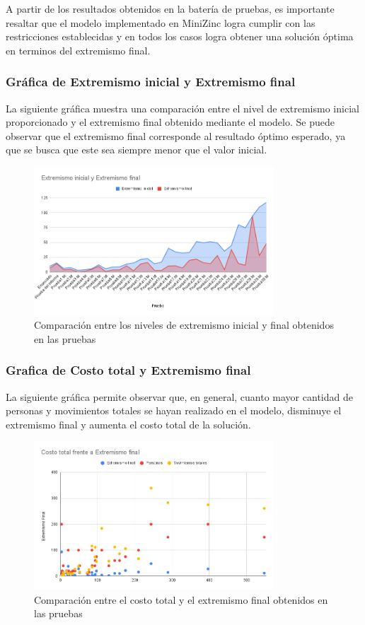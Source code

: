 \documentclass[11pt,letter]{article}
\begin{document}
A partir de los resultados obtenidos en la batería de pruebas, es importante resaltar que el modelo implementado en MiniZinc logra cumplir con las restricciones establecidas y en todos los casos logra obtener una solución óptima en terminos del extremismo final.

\subsubsection*{Gráfica de Extremismo inicial y Extremismo final}
La siguiente gráfica muestra una comparación entre el nivel de extremismo inicial proporcionado y el extremismo final obtenido mediante el modelo. Se puede observar que el extremismo final corresponde al resultado óptimo esperado, ya que se busca que este sea siempre menor que el valor inicial.
\begin{figure}[H]
    \centering
    \includegraphics[width=0.8\textwidth]{resources/extremismoiyf.png}
    \caption{Comparación entre los niveles de extremismo inicial y final obtenidos en las pruebas}
\end{figure}

\subsubsection*{Grafica de Costo total y Extremismo final}
La siguiente gráfica permite observar que, en general, cuanto mayor cantidad de personas y movimientos totales se hayan realizado en el modelo, disminuye el extremismo final y aumenta el costo total de la solución.

\begin{figure}[H]
    \centering
    \includegraphics[width=0.8\textwidth]{resources/costototalvsextremismofinal.png}
    \caption{Comparación entre el costo total y el extremismo final obtenidos en las pruebas}
\end{figure}
\end{document}
